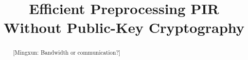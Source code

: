 \documentclass{llncs}
\theoremstyle{plain}
\theoremstyle{definition}
\newcommand{\mingxun}[1]{{\footnotesize\color{magenta}[Mingxun: #1]}}
\begin{document}
\title{Efficient Preprocessing PIR Without Public-Key Cryptography}

\date{}




\maketitle
\thispagestyle{empty}

\ifnum{}

\fi

\begin{abstract}
    \mingxun{Bandwidth or communication?}
    
\end{abstract}




% 




%



\ifnum{}
%

\else
{}

\fi

% 
\appendix
\ifnum{}
\newpage
\fi




\appendix





%
\end{document}
